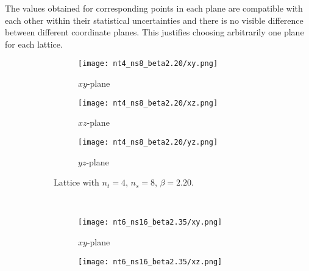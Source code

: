 The values obtained for corresponding points in each plane are compatible with each other within their statistical uncertainties and there is no visible difference between different coordinate planes.
This justifies choosing arbitrarily one plane for each lattice.
\begin{figure}[!htbp]
    \centering
    \begin{subfigure}[t]{\textwidth}
        \centering
        \begin{subfigure}[t]{0.32\textwidth}
            \renewcommand\thesubfigure{\alph{subfigure}1}
            \texttt{[image: nt4\_ns8\_beta2.20/xy.png]}
            \caption{$xy$-plane}
            \label{4F:PotentialPlanes48xy}
        \end{subfigure}
        \hfill
        \begin{subfigure}[t]{0.32\textwidth}
            \addtocounter{subfigure}{-1}
            \renewcommand\thesubfigure{\alph{subfigure}2}
            \texttt{[image: nt4\_ns8\_beta2.20/xz.png]}
            \caption{$xz$-plane}
            \label{4F:PotentialPlanes48xz}
        \end{subfigure}
        \hfill
        \begin{subfigure}[t]{0.32\textwidth}
            \addtocounter{subfigure}{-1}
            \renewcommand\thesubfigure{\alph{subfigure}3}
            \texttt{[image: nt4\_ns8\_beta2.20/yz.png]}
            \caption{$yz$-plane}
            \label{4F:PotentialPlanes48yz}
        \end{subfigure}
        \addtocounter{subfigure}{-1}
        \caption{Lattice with $n_t=4$, $n_s=8$, $\beta=2.20$.}
        \label{4F:PotentialPlanes48}
    \end{subfigure}\\
    \vspace{\baselineskip}
    \begin{subfigure}[b]{\textwidth}
        \centering
        \begin{subfigure}[b]{0.32\textwidth}
            \renewcommand\thesubfigure{\alph{subfigure}1}
            \texttt{[image: nt6\_ns16\_beta2.35/xy.png]}
            \caption{$xy$-plane}
            \label{4F:PotentialPlanes616xy}
        \end{subfigure}
        \hfill
        \begin{subfigure}[b]{0.32\textwidth}
            \addtocounter{subfigure}{-1}
            \renewcommand\thesubfigure{\alph{subfigure}2}
            \texttt{[image: nt6\_ns16\_beta2.35/xz.png]}

\end{subfigure}
\end{subfigure}
\end{figure}
